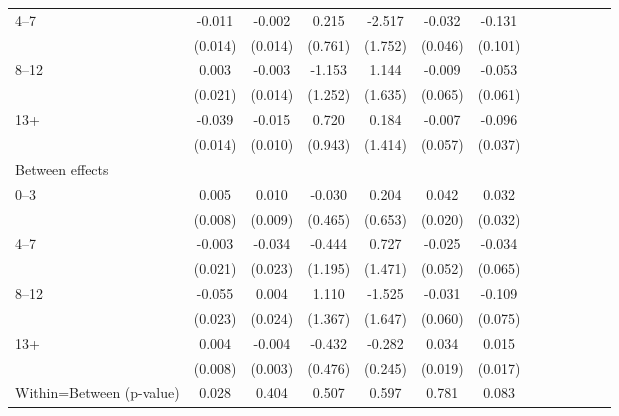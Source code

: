 \documentclass[10pt,letterpaper]{article}
\begin{document}
\begin{table}[!ht]
\begin{center}
\begin{adjustbox}{max width=\linewidth}
\begin{threeparttable}
{\begin{tabular}{l*{6}{S S}}
						4--7 &    -0.011         &   -0.002         &    0.215         &   -2.517         &   -0.032         &   -0.131         \\
						&  (0.014)         &  (0.014)         &  (0.761)         &  (1.752)         &  (0.046)         &  (0.101)         \\
						8--12 &    0.003         &   -0.003         &   -1.153         &    1.144         &   -0.009         &   -0.053         \\
						&  (0.021)         &  (0.014)         &  (1.252)         &  (1.635)         &  (0.065)         &  (0.061)         \\
						13+ &    -0.039\sym{***}&   -0.015         &    0.720         &    0.184         &   -0.007         &   -0.096\sym{***}\\
						&  (0.014)         &  (0.010)         &  (0.943)         &  (1.414)         &  (0.057)         &  (0.037)         \\
						Between effects&                  &                  &                  &                  &                  &                  \\
						0--3 &    0.005         &    0.010         &   -0.030         &    0.204         &    0.042\sym{**} &    0.032         \\
						&  (0.008)         &  (0.009)         &  (0.465)         &  (0.653)         &  (0.020)         &  (0.032)         \\
						4--7 &    -0.003         &   -0.034         &   -0.444         &    0.727         &   -0.025         &   -0.034         \\
						&  (0.021)         &  (0.023)         &  (1.195)         &  (1.471)         &  (0.052)         &  (0.065)         \\
						8--12 &   -0.055\sym{**} &    0.004         &    1.110         &   -1.525         &   -0.031         &   -0.109         \\
						&  (0.023)         &  (0.024)         &  (1.367)         &  (1.647)         &  (0.060)         &  (0.075)         \\
						13+ &    0.004         &   -0.004         &   -0.432         &   -0.282         &    0.034\sym{*}  &    0.015         \\
						&  (0.008)         &  (0.003)         &  (0.476)         &  (0.245)         &  (0.019)         &  (0.017)         \\
						Within=Between (p-value)&  0.028         &    0.404         &    0.507         &    0.597         &    0.781         &    0.083         \\

\end{tabular}}
\end{threeparttable}
\end{adjustbox}
\end{center}
\end{table}
\end{document}
